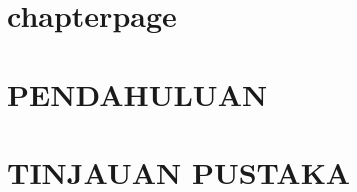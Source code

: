 \documentclass[12pt, a4paper, onecolumn, oneside, final]{report}
\theoremstyle{definition}
\numberwithin{equation}{chapter}
\begin{document}
%
\newpage
\makeatother
{}
\assignpagestyle\chapter{chapterpage}
\setcounter{page}{1}
\pagestyle{myPS}
\def\thechapter{\Roman{chapter}} 
\def\thesection{\arabic{chapter}.\arabic{section}}
\def\thesubsection{\arabic{chapter}.\arabic{section}.\arabic{subsection}}
\def\theequation{\arabic{chapter}.\arabic{equation}}
\def\thefigure{\arabic{chapter}.\arabic{figure}}
\def\thetable{\arabic{chapter}.\arabic{table}}
\chapter{PENDAHULUAN}

\chapter{TINJAUAN PUSTAKA}
%
\end{document}
